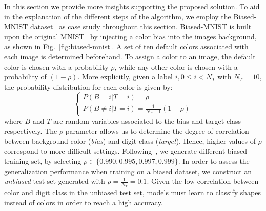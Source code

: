 In this section we provide more insights supporting the proposed solution. 
To aid in the explanation of the different steps of the algorithm, we employ the Biased-MNIST dataset~\cite{bahng2019rebias} as case study throughout this section. Biased-MNIST is built upon the original MNIST~\cite{lecun2010mnist} by injecting a color bias into the images background, as shown in Fig.~\ref{fig:biased-mnist}. 
A set of ten default colors associated with each image is determined beforehand. 
To assign a color to an image, the default color is chosen with a probability $\rho$, while any other color is chosen with a probability of $(1-\rho)$. 
More explicitly, given a label $i, 0 \leq i < N_T$ with $N_T=10$,
the probability distribution for each color is given by: 
\begin{equation}
    \begin{cases}
        P(B = i|T = i) = \rho \\
        P(B \neq i | T = i) = \frac{1}{N_T - 1} (1 - \rho)
    \end{cases}
    \label{eq:dist-b-given-t}
\end{equation}
where $B$ and $T$ are random variables associated to the bias and target class respectively.
The $\rho$ parameter allows us to determine the degree of correlation between background color (\emph{bias}) and digit class (\emph{target}). %
Hence, higher values of $\rho$ correspond to more difficult settings.
Following~\cite{bahng2019rebias}, we generate different biased training set, by selecting $\rho \in \{0.990, 0.995, 0.997, 0.999 \}$. In order to assess the generalization performance when training on a biased dataset, we construct an \emph{unbiased} test set generated with $\rho =\frac{1}{N_T} = 0.1$. Given the low correlation between color and digit class in the unbiased test set, models must learn to classify shapes instead of colors in order to reach a high accuracy. 


